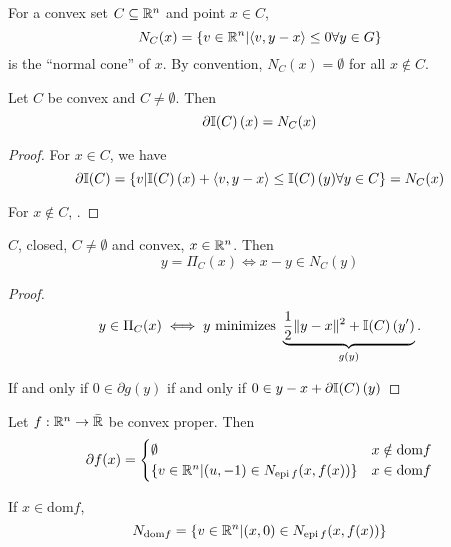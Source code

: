\begin{defn}
  \label{defn:cones_and_generalized_inequalities:3}
  For a convex set $C \subseteq \mathbb{R}^{n}$ and point $x \in C$,
  \begin{equation}
    \label{eq:33}
    N_{C}(x) = \{ v \in \mathbb{R}^{n} | \langle v, y -x \rangle \leq 0
    \forall y \in G \}
  \end{equation} is the ``normal cone'' of $x$.  By convention,
  $N_{C}(x) = \emptyset$ for all $x \notin C$.
\end{defn}

\begin{proposition}
  Let $C$ be convex and $C \neq \emptyset$.  Then
  \begin{equation}
    \label{eq:34}
    \partial \I{C}(x) = N_{C}(x)
  \end{equation}
\end{proposition}

\begin{proof}
  For $x \in C$, we have
  \begin{equation}
    \label{eq:35}
    \partial \I{C} = \{ v | \I{C}(x) + \langle v, y - x \rangle \leq
    \I{C}(y) \forall y \in C \} = N_{C}(x)
  \end{equation}

  For $x \notin C$, .
\end{proof}


\begin{proposition}
  $C$, closed, $C \neq \emptyset$ and convex, $x \in \mathbb{R}^{n}$.  Then
  \begin{equation}
    \label{eq:36}
    y = \Pi_{C}(x) \iff x - y \in N_{C}(y)
  \end{equation}
\end{proposition}

\begin{proof}
  \begin{equation}
    \label{eq:37}
    y \in \Pi_{C}(x) \iff y \text{ minimizes } \underbrace{\frac{1}{2} \| y - x \|^{2} + \I{C}(y')}_{g(y)}.
  \end{equation}

  If and only if $0 \in \partial g(y)$ if and only if $0 \in y - x
  + \partial \I{C}(y)$
\end{proof}

\begin{proposition}
  Let $f: \mathbb{R}^{n} \rightarrow \bar {\mathbb{R}}$ be convex proper.  Then
  \begin{equation}
    \label{eq:38}
    \partial f(x) =
    \begin{cases}
      \emptyset & x \notin \text{dom} f \\
      \{ v \in \mathbb{R}^{n} | (u, -1) \in N_{\operatorname*{epi} f} (x, f(x))\} & x
      \in \text{dom} f
    \end{cases} 
  \end{equation}

  If $x \in \text{dom} f$,
  \begin{equation}
    \label{eq:39}
    N_{\text{dom} f} = \{ v \in \mathbb{R}^{n} | (x, 0) \in N_{\operatorname*{epi} f}
    (x, f(x)) \}
  \end{equation}
\end{proposition}

